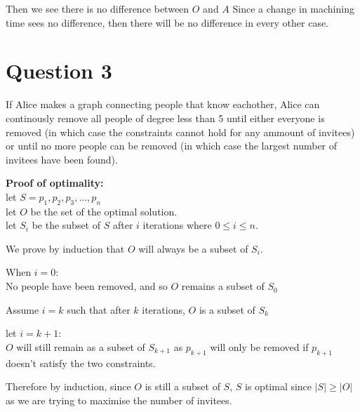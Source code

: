 \documentclass{article}
\begin{document}
Then we see there is no difference between $O$ and $A$
Since a change in machining time sees no difference, then there will be no difference in every other case.






\section*{Question 3}
If Alice makes a graph connecting people that know eachother, Alice can continously remove all people of degree less than 5 until either everyone is removed (in which case the constraints cannot hold for any ammount of invitees) or until no more people can be removed (in which case the largest number of invitees have been found).

\textbf{Proof of optimality:}\\
let $S = {p_1, p_2, p_3, \ldots, p_n}$\\
let $O$ be the set of the optimal solution.\\
let $S_i$ be the subset of $S$ after $i$ iterations where $0 \leq i \leq n$.

We prove by induction that $O$ will always be a subset of $S_i$.

When $i = 0$:\\
No people have been removed, and so $O$ remains a subset of $S_0$

Assume $i = k$ such that after $k$ iterations, $O$ is a subset of $S_k$

let $i = k + 1$:\\
$O$ will still remain as a subset of $S_{k+1}$ as $p_{k+1}$ will only be removed if $p_{k+1}$ doesn't satisfy the two constraints.

Therefore by induction, since $O$ is still a subset of $S$, $S$ is optimal since $|S| \geq |O|$ as we are trying to maximise the number of invitees.
\end{document}

